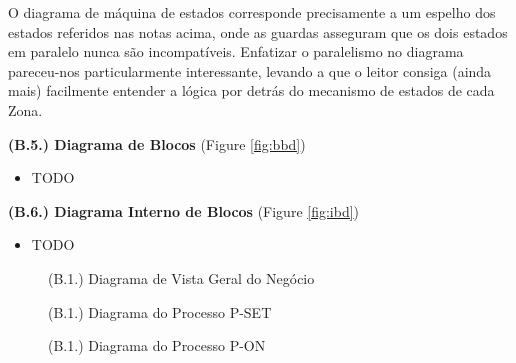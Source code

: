 \documentclass[12pt,a4paper]{article}
\begin{document}
\begin{tcolorbox}[enhanced jigsaw,colback=bg,boxrule=0pt,arc=4pt]
  O diagrama de máquina de estados corresponde precisamente a um espelho dos estados referidos nas notas
  acima, onde as guardas asseguram que os dois estados em paralelo nunca são incompatíveis.
  Enfatizar o paralelismo no diagrama pareceu-nos particularmente interessante, levando
  a que o leitor consiga (ainda mais) facilmente entender a lógica por detrás do mecanismo
  de estados de cada Zona.

  \begin{small}
    \textbf{(B.5.) Diagrama de Blocos} (Figure \ref{fig:bbd})
  \end{small}
  \begin{itemize}
    \item TODO
  \end{itemize}

  \begin{small}
    \textbf{(B.6.) Diagrama Interno de Blocos} (Figure \ref{fig:ibd})
  \end{small}
  \begin{itemize}
    \item TODO
  \end{itemize}
\end{tcolorbox}

\begin{landscape}
  \begin{figure}
    \centering
    
    \caption{(B.1.) Diagrama de Vista Geral do Negócio}
    \label{fig:archimate}
  \end{figure}
\end{landscape}

\begin{landscape}
  \begin{figure}
    \centering
    
    \caption{(B.1.) Diagrama do Processo P-SET}
    \label{fig:p-set-bpmn}
  \end{figure}
\end{landscape}

\begin{landscape}
  \begin{figure}
    \centering
    
    \caption{(B.1.) Diagrama do Processo P-ON}
    \label{fig:p-on-bpmn}
  \end{figure}
\end{landscape}
\end{document}
